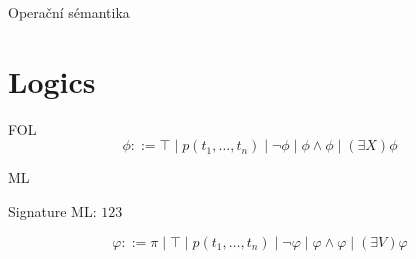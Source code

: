 \documentclass[11pt]{beamer}
\begin{document}
\begin{frame}{Operační sémantika}
\begin{figure}
\begin{tikzpicture}
%
%
%
%


\end{tikzpicture}
\end{figure}
\end{frame}

\section{Logics}


\begin{frame}{FOL}
\begin{equation}
\phi ::= \top \mid p(t_1,\ldots,t_n) \mid \neg \phi \mid \phi \land \phi \mid \left( \exists X \right) \phi
\end{equation}
\end{frame}

\begin{frame}{ML}

Signature ML: $ 123 $

\begin{equation}
\varphi ::= \pi \mid \top \mid p(t_1,\ldots,t_n) \mid \neg \varphi \mid \varphi \land \varphi \mid \left( \exists V \right) \varphi
\end{equation}
\end{frame}
\end{document}
